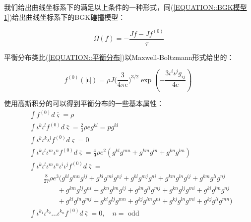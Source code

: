 \documentclass[MathematicsNumericsDerivationsAndOpenFOAM.tex]{subfiles}
\begin{document}
我们给出曲线坐标系下的满足以上条件的一种形式，同(\ref{EQUATION::BGK模型1})给出曲线坐标系下的BGK碰撞模型：

\begin{equation}
  \boxed{
  \Omega(f)= -\frac{Jf-Jf^{(0)}}{\tau}
  }
\end{equation}


平衡分布类比(\ref{EQUATION::平衡分布})以Maxwell-Boltzmann形式给出的：
%
%

\begin{equation}
  \boxed{
    f^{(0)}(| \boldsymbol{\iota}|) = \rho J {(\frac{3}{4\pi e}})^{3/2}\exp({-\frac{3 {\iota^i\iota^jg_{ij}}}{4e}})
  }
  \label{EQUATION::平衡分布2} ~
\end{equation}


使用高斯积分的可以得到平衡分布的一些基本属性：
%
%
\begin{equation}
  \begin{aligned}
     & \int  f^{(0)} d\bar{\varsigma}=\rho                                                                                                                        \\
     & \int  \iota^{k} \iota^{l} f^{(0)}d\bar{\varsigma} = \frac{2}{3}\rho e g^{k l}  =pg^{k l}                                                                   \\
     & \int  \iota^{k} \iota^{k} \iota^{l} f^{(0)}d\bar{\varsigma}  = 0                                                                                           \\
     & \int  \iota^{k} \iota^{l}  \iota^{m} \iota^{n} f^{(0)}d\bar{\varsigma}  =     \frac{4}{9}\rho e^2 (g^{kl}g^{mn}+g^{km}g^{ln}+g^{kn}g^{lm})                 \\
     & \int  \iota^{k} \iota^{l}  \iota^{m} \iota^{n} \iota^{i} \iota^{j} f^{(0)}d\bar{\varsigma}  =                                                              \\
     & \quad\quad  \frac{8}{27}\rho e^3 ( g^{k l} g^{m n} g^{i j}+g^{k l} g^{m i} g^{n j}+g^{k l} g^{m j} g^{n i}+g^{k m} g^{l n} g^{i j}+g^{k m} g^{l i} g^{n j} \\
     & \quad\quad\quad\quad +g^{k m} g^{l j} g^{n i}+g^{k n} g^{l m} g^{i j}+g^{k n} g^{l i} g^{m j}+g^{k n} g^{l j} g^{m i}+g^{k i} g^{l m} g^{n j}              \\
     & \quad\quad\quad\quad +g^{k i} g^{l n} g^{m j}+g^{k i} g^{l j} g^{m n}+g^{k j} g^{l m} g^{n i}+g^{k j} g^{l n} g^{m i}+g^{k j} g^{l i} g^{m n})             \\
     & \int \iota^{k_{1}} \iota^{k_{2}} \ldots \iota^{k_{n}}  f^{(0)}d \bar{\varsigma}  =0, \quad n=\text { odd }
  \end{aligned}
  \label{EQUATION::A.19} ~
\end{equation}
%
%
\end{document}
